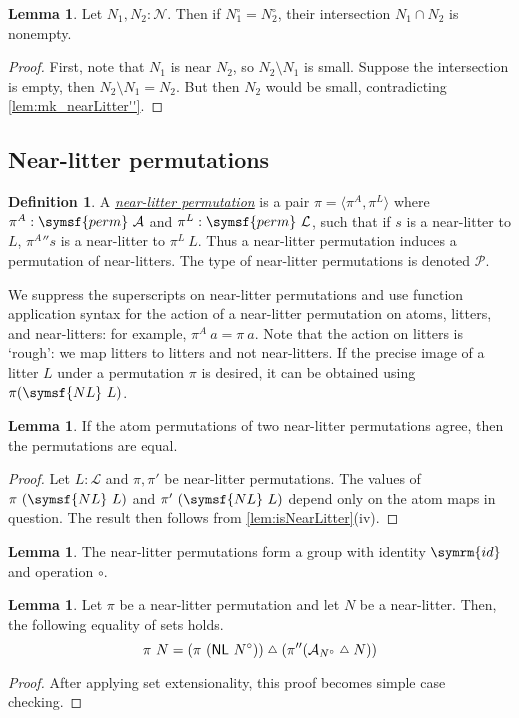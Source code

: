 \documentclass{article}
\newcommand{\cdef}[3]{\href{https://leanprover-community.github.io/con-nf/doc/ConNF/#1.html\#ConNF.#2}{\emph{#3}}}
\newcommand{\symmdiff}{\mathrel{\raisebox{1pt}{\( \mathsmaller\triangle \)}}}
\theoremstyle{definition}
\newtheorem{definition}{Definition}[section]
\newtheorem{lemma}[theorem]{Lemma}
\theoremstyle{remark}
\begin{document}
\begin{lemma}
    Let \( N_1, N_2 : \mathcal N \).
    Then if \( N_1^\circ = N_2^\circ \), their intersection \( N_1 \cap N_2 \) is nonempty.
\end{lemma}
\begin{proof}
    First, note that \( N_1 \) is near \( N_2 \), so \( N_2 \setminus N_1 \) is small.
    Suppose the intersection is empty, then \( N_2 \setminus N_1 = N_2 \).
    But then \( N_2 \) would be small, contradicting \cref{lem:mk_nearLitter''}.
\end{proof}

\subsection{Near-litter permutations}

\begin{definition}
    A \cdef{Atom/NearLitterPerm}{NearLitterPerm}{near-litter permutation} is a pair \( \pi = \langle \pi^A, \pi^L \rangle \) where \( \pi^A : \symsf{perm}\ \mathcal A \) and \( \pi^L : \symsf{perm}\ \mathcal L \), such that if \( s \) is a near-litter to \( L \), \( {\pi^A} '' s \) is a near-litter to \( \pi^L\ L \).
    Thus a near-litter permutation induces a permutation of near-litters.
    The type of near-litter permutations is denoted \( \mathcal P \).
\end{definition}
We suppress the superscripts on near-litter permutations and use function application syntax for the action of a near-litter permutation on atoms, litters, and near-litters: for example, \( \pi^A\ a = \pi\ a \).
Note that the action on litters is `rough': we map litters to litters and not near-litters.
If the precise image of a litter \( L \) under a permutation \( \pi \) is desired, it can be obtained using \( \pi(\symsf{NL}\ L) \).
\begin{lemma}
    \label{lem:NearLitterPerm.atomPerm_injective}
    If the atom permutations of two near-litter permutations agree, then the permutations are equal.
\end{lemma}
\begin{proof}
    Let \( L : \mathcal L \) and \( \pi, \pi' \) be near-litter permutations.
    The values of \( \pi\ (\symsf{NL}\ L) \) and \( \pi'\ (\symsf{NL}\ L) \) depend only on the atom maps in question.
    The result then follows from \cref{lem:isNearLitter}(iv).
\end{proof}
\begin{lemma}
    The near-litter permutations form a group with identity \( \symrm{id} \) and operation \( \circ \).
\end{lemma}
\begin{lemma}
    \label{lem:smul_nearLitter_eq_smul_symmDiff_smul}
    Let \( \pi \) be a near-litter permutation and let \( N \) be a near-litter.
    Then, the following equality of sets holds.
    \[ \pi\ N = (\pi\ (\mathsf{NL}\ N^\circ)) \symmdiff (\pi '' (\mathcal A_{N^\circ} \symmdiff N)) \]
\end{lemma}
\begin{proof}
    After applying set extensionality, this proof becomes simple case checking.
\end{proof}
\end{document}
